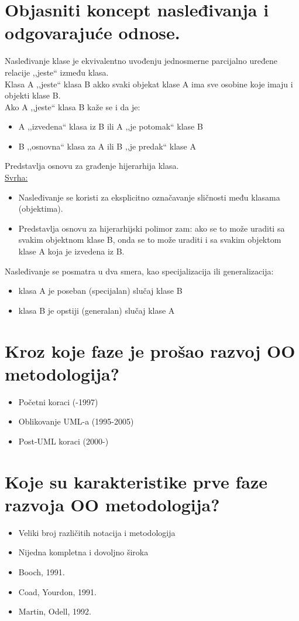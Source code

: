 \documentclass[a4paper]{article}
\begin{document}
\section{Objasniti koncept nasleđivanja  i odgovarajuće odnose.}
  Nasleđivanje klase je ekvivalentno uvođenju jednosmerne parcijalno uređene 
  relacije ,,jeste`` između klasa.\\
  \indent Klasa A ,,jeste`` klasa B akko svaki objekat klase A ima sve osobine koje imaju i objekti klase B.\\
  Ako A ,,jeste`` klasa B kaže se i da je:
  \begin{itemize}
    \item A ,,izvedena`` klasa iz B ili A ,,je potomak`` klase B
    \item B ,,osnovna`` klasa za A ili B ,,je predak`` klase A
  \end{itemize}
  Predstavlja osnovu za građenje hijerarhija klasa.\\
  \underline{Svrha:}
  \begin{itemize}
    \item Nasleđivanje se koristi za eksplicitno označavanje sličnosti među klasama (objektima).
    \item Predstavlja osnovu za hijerarhijski polimor zam: ako se to može uraditi sa svakim objektnom klase B, 
          onda se to može uraditi i sa svakim objektom klase A koja je izvedena iz B.
  \end{itemize}
  Nasleđivanje se posmatra u dva smera, kao specijalizacija ili generalizacija:
  \begin{itemize}
    \item klasa A je poseban (specijalan) slučaj klase B
    \item klasa B je opstiji (generalan) slučaj klase A
  \end{itemize}

\section{Kroz koje faze je prošao razvoj OO metodologija?}
  \begin{itemize}
    \item Početni koraci (-1997)
    \item Oblikovanje UML-a (1995-2005)
    \item Post-UML koraci (2000-)
  \end{itemize}

\section{Koje su karakteristike prve faze razvoja OO metodologija?}
  \begin{itemize}
    \item Veliki broj različitih notacija i metodologija
    \item Nijedna kompletna i dovoljno široka
    \item Booch, 1991.
    \item Coad, Yourdon, 1991.
    \item Martin, Odell, 1992.
  \end{itemize}
\end{document}
